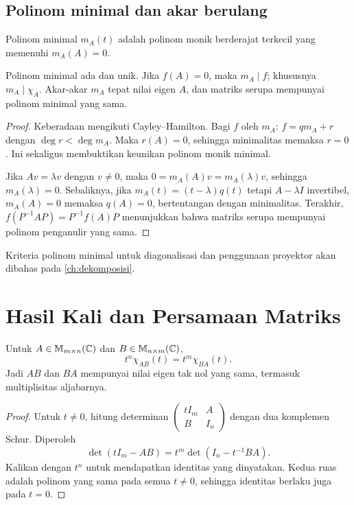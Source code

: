 \subsection{Polinom minimal dan akar berulang}

\begin{definisi}
    Polinom minimal $m_A(t)$ adalah polinom monik berderajat terkecil
    yang memenuhi $m_A(A)=0$.
\end{definisi}

\begin{prop}
    \label{eigen:sifat-minimal}
    Polinom minimal ada dan unik. Jika $f(A)=0$, maka $m_A\mid f$;
    khususnya $m_A\mid\chi_A$.
    Akar-akar $m_A$ tepat nilai eigen $A$, dan matriks serupa mempunyai
    polinom minimal yang sama.
\end{prop}
\begin{proof}
    Keberadaan mengikuti Cayley--Hamilton.
    Bagi $f$ oleh $m_A$: $f=qm_A+r$ dengan $\deg r<\deg m_A$.
    Maka $r(A)=0$, sehingga minimalitas memaksa $r=0$.
    Ini sekaligus membuktikan keunikan polinom monik minimal.

    Jika $Av=\lambda v$ dengan $v\ne0$, maka
    $0=m_A(A)v=m_A(\lambda)v$, sehingga $m_A(\lambda)=0$.
    Sebaliknya, jika $m_A(t)=(t-\lambda)q(t)$ tetapi $A-\lambda I$
    invertibel, $m_A(A)=0$ memaksa $q(A)=0$, bertentangan dengan minimalitas.
    Terakhir, $f(P^{-1}AP)=P^{-1}f(A)P$ menunjukkan bahwa matriks
    serupa mempunyai polinom penganulir yang sama.
\end{proof}


Kriteria polinom minimal untuk diagonalisasi dan penggunaan proyektor
akan dibahas pada \autoref{ch:dekomposisi}.

\section{Hasil Kali dan Persamaan Matriks}
\label{eigen:hasilkali}

\begin{teorema}
    Untuk $A\in\mathbb{M}_{m\times n}(\mathbb{C})$ dan $B\in\mathbb{M}_{n\times m}(\mathbb{C})$,
    \[
        t^n\chi_{AB}(t)=t^m\chi_{BA}(t).
    \]
    Jadi $AB$ dan $BA$ mempunyai nilai eigen tak nol yang sama,
    termasuk multiplisitas aljabarnya.
\end{teorema}
\begin{proof}
    Untuk $t\ne0$, hitung determinan
    $\begin{pmatrix}tI_m&A\\B&I_n\end{pmatrix}$ dengan dua komplemen Schur.
    Diperoleh
    \[
        \det(tI_m-AB)=t^m\det(I_n-t^{-1}BA).
    \]
    Kalikan dengan $t^n$ untuk mendapatkan identitas yang dinyatakan.
    Kedua ruas adalah polinom yang sama pada semua $t\ne0$,
    sehingga identitas berlaku juga pada $t=0$.
\end{proof}

